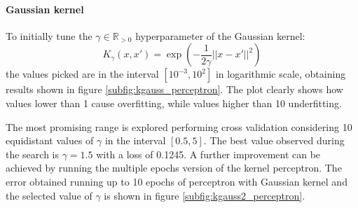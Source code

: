 \documentclass{article}
\begin{document}
\paragraph{Gaussian kernel}
To initially tune the $\gamma \in \mathbb{R}_{>0}$ hyperparameter of the Gaussian kernel:
\begin{equation}
	K_\gamma(x, x') = \exp\left(-\frac{1}{2\gamma} ||x-x'||^2\right)
\end{equation}
the values picked are in the interval $[10^{-3}, 10^2]$ in logarithmic scale, obtaining results shown in figure \ref{subfig:kgauss_perceptron}. The plot clearly shows how values lower than 1 cause overfitting, while values higher than 10 underfitting. 

The most promising range is explored performing cross validation considering 10 equidistant values of $\gamma$ in the interval $[0.5, 5]$. The best value observed during the search is $\gamma=1.5$ with a loss of 0.1245. A further improvement can be achieved by running the multiple epochs version of the kernel perceptron. The error obtained running up to 10 epochs of perceptron with Gaussian kernel and the selected value of $\gamma$ is shown in figure \ref{subfig:kgauss2_perceptron}.
\end{document}
